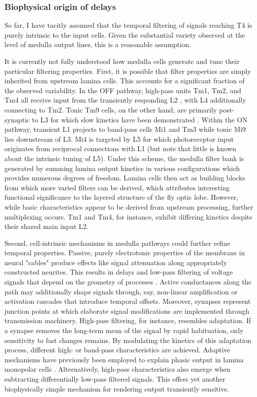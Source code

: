 \subsubsection{Biophysical origin of delays}
So far, I have tacitly assumed that the temporal filtering of signals reaching T4 is purely intrinsic to the input cells. Given the substantial variety observed at the level of medulla output lines, this is a reasonable assumption.

It is currently not fully understood how medulla cells generate and tune their particular filtering properties. First, it is possible that filter properties are simply inherited from upstream lamina cells. This accounts for a significant fraction of the observed variability. In the OFF pathway, high-pass units Tm1, Tm2, and Tm4 all receive input from the transiently responding L2 \citep{Fischbach:1989uw,RiveraAlba:2011dd,Takemura:2017aa}, with L4 additionally connecting to Tm2. Tonic Tm9 cells, on the other hand, are primarily post-synaptic to L3 for which slow kinetics have been demonstrated \citep{Silies:2013jp}. Within the ON pathway, transient L1 projects to band-pass cells Mi1 and Tm3 while tonic Mi9 lies downstream of L3. Mi4 is targeted by L5 for which photoreceptor input originates from reciprocal connections with L1 (but note that little is known about the intrinsic tuning of L5). Under this scheme, the medulla filter bank is generated by summing lamina output kinetics in various configurations which provides numerous degrees of freedom. Lamina cells then act as building blocks from which more varied filters can be derived, which attributes interesting functional significance to the layered structure of the fly optic lobe. However, while basic characteristics appear to be derived from upstream processing, further multiplexing occurs. Tm1 and Tm4, for instance, exhibit differing kinetics despite their shared main input L2.

Second, cell-intrinsic mechanisms in medulla pathways could further refine temporal properties. Passive, purely electrotonic properties of the membrane in neural "cables" produce effects like signal attenuation along appropriately constructed neurites. This results in delays and low-pass filtering of voltage signals that depend on the geometry of processes \citep{Koch:2004aa}. Active conductances along the path may additionally shape signals through, say, non-linear amplification or activation cascades that introduce temporal offsets. Moreover, synapses represent junction points at which elaborate signal modifications are implemented through transmission machinery. High-pass filtering, for instance, resembles adaptation. If a synapse removes the long-term mean of the signal by rapid habituation, only sensitivity to fast changes remains. By modulating the kinetics of this adaptation process, different high- or band-pass characteristics are achieved. Adaptive mechanisms have previously been employed to explain phasic output in lamina monopolar cells \citep{Laughlin:1978aa}. Alternatively, high-pass characteristics also emerge when subtracting differentially low-pass filtered signals. This offers yet another biophysically simple mechanism for rendering output transiently sensitive.

